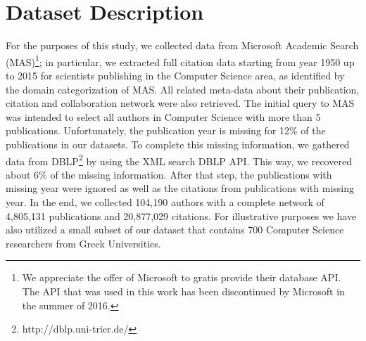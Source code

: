 \section{Dataset Description}\label{dataset-description}

For the purposes of this study, we collected data from Microsoft
Academic Search (MAS)\footnote{We appreciate the offer of Microsoft to
  gratis provide their database API. The API that was used in this work
  has been discontinued by Microsoft in the summer of 2016.}; in
particular, we extracted full citation data starting from year 1950 up
to 2015 for scientists publishing in the Computer Science area, as
identified by the domain categorization of MAS. All related meta-data
about their publication, citation and collaboration network were also
retrieved. The initial query to MAS was intended to select all authors
in Computer Science with more than 5 publications. Unfortunately, the
publication year is missing for 12\% of the publications in our
datasets. To complete this missing information, we gathered data from
DBLP\footnote{http://dblp.uni-trier.de/} by using the XML search DBLP
API. This way, we recovered about 6\% of the missing information. After
that step, the publications with missing year were ignored as well as
the citations from publications with missing year. In the end, we
collected 104,190 authors with a complete network of 4,805,131
publications and 20,877,029 citations. For illustrative purposes we have
also utilized a small subset of our dataset that contains 700 Computer
Science researchers from Greek Universities.